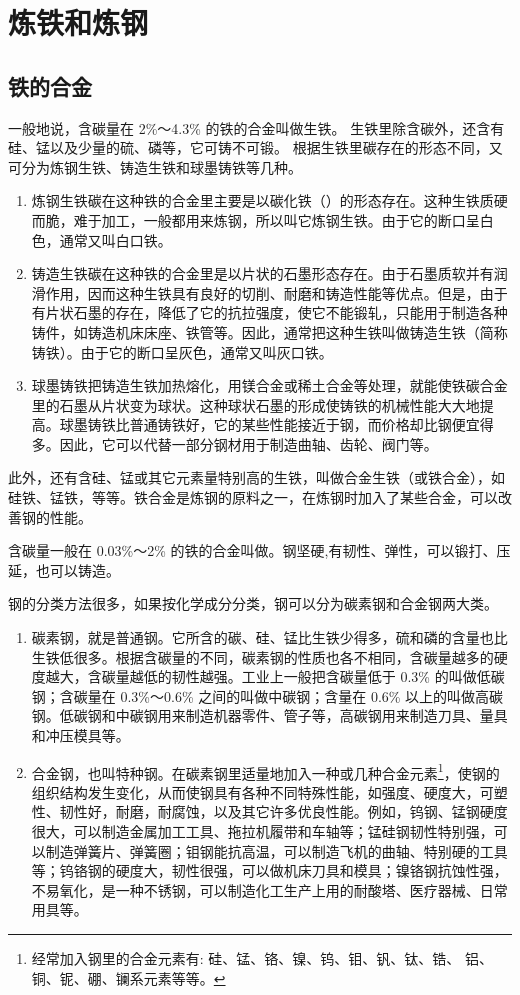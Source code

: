 \section{炼铁和炼钢}
\subsection{铁的合金}
一般地说，含碳量在 2\%～4.3\% 的铁的合金叫做生铁。
生铁里除含碳外，还含有硅、锰以及少量的硫、磷等，它可铸不可锻。
根据生铁里碳存在的形态不同，又可分为炼钢生铁、铸造生铁和球墨铸铁等几种。
\begin{enumerate}
  \item 炼钢生铁\quad 碳在这种铁的合金里主要是以碳化铁（）的形态存在。这种生铁质硬而脆，难于加工，一般都用来炼钢，所以叫它炼钢生铁。由于它的断口呈白色，通常又叫白口铁。
  \item 铸造生铁\quad 碳在这种铁的合金里是以片状的石墨形态存在。由于石墨质软并有润滑作用，因而这种生铁具有良好的切削、耐磨和铸造性能等优点。但是，由于有片状石墨的存在，降低了它的抗拉强度，使它不能锻轧，只能用于制造各种铸件，如铸造机床床座、铁管等。因此，通常把这种生铁叫做铸造生铁（简称铸铁）。由于它的断口呈灰色，通常又叫灰口铁。
  \item 球墨铸铁\quad 把铸造生铁加热熔化，用镁合金或稀土合金等处理，就能使铁碳合金里的石墨从片状变为球状。这种球状石墨的形成使铸铁的机械性能大大地提高。球墨铸铁比普通铸铁好，它的某些性能接近于钢，而价格却比钢便宜得多。因此，它可以代替一部分钢材用于制造曲轴、齿轮、阀门等。
\end{enumerate}

此外，还有含硅、锰或其它元素量特别高的生铁，叫做合金生铁（或铁合金），如硅铁、锰铁，等等。铁合金是炼钢的原料之一，在炼钢时加入了某些合金，可以改善钢的性能。

含碳量一般在 0.03\%～2\% 的铁的合金叫做。钢坚硬,有韧性、弹性，可以锻打、压延，也可以铸造。

钢的分类方法很多，如果按化学成分分类，钢可以分为碳素钢和合金钢两大类。
\begin{enumerate}
  \item 碳素钢，就是普通钢。它所含的碳、硅、锰比生铁少得多，硫和磷的含量也比生铁低很多。根据含碳量的不同，碳素钢的性质也各不相同，含碳量越多的硬度越大，含碳量越低的韧性越强。工业上一般把含碳量低于 0.3\% 的叫做低碳钢；含碳量在 0.3\%～0.6\% 之间的叫做中碳钢；含量在 0.6\% 以上的叫做高碳钢。低碳钢和中碳钢用来制造机器零件、管子等，高碳钢用来制造刀具、量具和冲压模具等。
  \item 合金钢，也叫特种钢。在碳素钢里适量地加入一种或几种合金元素\footnote{经常加入钢里的合金元素有: 硅、锰、铬、镍、钨、钼、钒、钛、锆、 铝、铜、铌、硼、镧系元素等等。}，使钢的组织结构发生变化，从而使钢具有各种不同特殊性能，如强度、硬度大，可塑性、韧性好，耐磨，耐腐蚀，以及其它许多优良性能。例如，钨钢、锰钢硬度很大，可以制造金属加工工具、拖拉机履带和车轴等；锰硅钢韧性特别强，可以制造弹簧片、弹簧圈；钼钢能抗高温，可以制造飞机的曲轴、特别硬的工具等；钨铬钢的硬度大，韧性很强，可以做机床刀具和模具；镍铬钢抗蚀性强，不易氧化，是一种不锈钢，可以制造化工生产上用的耐酸塔、医疗器械、日常用具等。
\end{enumerate}

